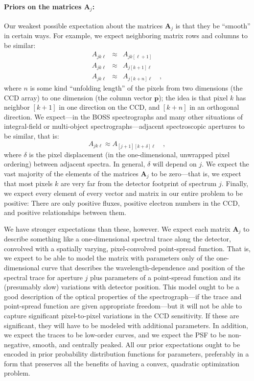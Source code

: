 \documentclass[12pt]{article}
\newcommand{\hmatrix}[1]{\boldsymbol{#1}}
\newcommand{\Amatrix}{\hmatrix{A}}
\newcommand{\pixels}{\hmatrix{p}}
\begin{document}
\paragraph{Priors on the matrices $\Amatrix_j$:}
Our weakest possible expectation about the matrices $\Amatrix_j$ is
that they be ``smooth'' in certain ways.  For example, we expect
neighboring matrix rows and columns to be similar:
\begin{eqnarray}\displaystyle
A_{jk\ell} & \approx & A_{jk[\ell+1]} \\
A_{jk\ell} & \approx & A_{j[k+1]\ell} \\
A_{jk\ell} & \approx & A_{j[k+n]\ell} \quad ,
\end{eqnarray}
where $n$ is some kind ``unfolding length'' of the pixels from
two dimensions (the CCD array) to one dimension (the column vector
$\pixels$); the idea is that pixel $k$ has neighbor $[k+1]$ in one
direction on the CCD, and $[k+n]$ in an orthogonal direction.  We
expect---in the BOSS spectrographs and many other situations of
integral-field or multi-object spectrographs---adjacent spectroscopic
apertures to be similar, that is:
\begin{equation}
A_{jk\ell} \approx A_{[j+1][k+\delta]\ell} \quad ,
\end{equation}
where $\delta$ is the pixel displacement (in the one-dimensional,
unwrapped pixel ordering) between adjacent spectra.  In general,
$\delta$ will depend on $j$.  We expect the vast majority of the
elements of the matrices $\Amatrix_j$ to be zero---that is, we expect
that most pixels $k$ are very far from the detector footprint of
spectrum $j$.  Finally, we expect every element of every vector and
matrix in our entire problem to be positive: There are only positive
fluxes, positive electron numbers in the CCD, and positive
relationships between them.

We have stronger expectations than these, however.  We expect each
matrix $\Amatrix_j$ to describe something like a one-dimensional
spectral trace along the detector, convolved with a spatially varying,
pixel-convolved point-spread function.  That is, we expect to be able
to model the matrix with parameters only of the one-dimensional curve
that describes the wavelength-dependence and position of the spectral
trace for aperture $j$ plus parameters of a point-spread function and
its (presumably slow) variations with detector position.  This model
ought to be a good description of the optical properties of the
spectrograph---if the trace and point-spread function are given
appropriate freedom---but it will not be able to capture significant
pixel-to-pixel variations in the CCD sensitivity.  If these are
significant, they will have to be modeled with additional parameters.
In addition, we expect the traces to be low-order curves, and we
expect the PSF to be non-negative, smooth, and centrally peaked.  All
our prior expectations ought to be encoded in prior probability
distribution functions for parameters, preferably in a form that
preserves all the benefits of having a convex, quadratic optimization
problem.
\end{document}
